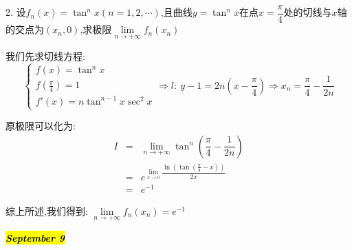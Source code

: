 2. 设$f_{n}(x)=\tan^n x(n=1,2,\cdots)$,且曲线$y=\tan^n x$在点$x=\dfrac{\pi}{4}$处的切线与$x$轴的交点为$(x_{n},0)$,求极限$\lim\limits_{n\rightarrow+\infty}f_{n}(x_{n})$
\begin{solution}

	我们先求切线方程:  
	$$\left\lbrace
	\begin{array}{l}
		f(x)=\tan^n x\\
		f(\frac{\pi}{4})=1\\
		f'(x)=n\tan^{n-1}x\sec^2 x
	\end{array}
	\right. \Rightarrow l:\ y-1=2n(x-\dfrac{\pi}{4})\Rightarrow x_{n}=\dfrac{\pi}{4}-\dfrac{1}{2n}$$
	
	原极限可以化为:  
	\begin{eqnarray*}
		I&=&\lim\limits_{n\rightarrow+\infty}\tan^{n}\left( \dfrac{\pi}{4}-\dfrac{1}{2n}\right) \\
		&=&e^{\lim\limits_{x\rightarrow 0}\dfrac{\ln(\tan(\frac{\pi}{4}-x))}{2x}}\\
		&=&e^{-1}
	\end{eqnarray*}

	综上所述,我们得到:  $\lim\limits_{n\rightarrow+\infty}f_{n}(x_{n})=e^{-1}$
\end{solution}

\hl{\textbf{\textit{September 9}}}

